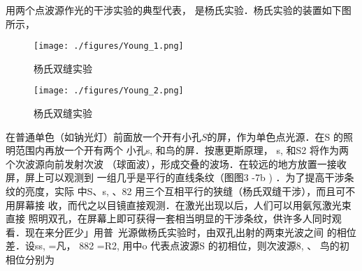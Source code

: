 
用两个点波源作光的干涉实验的典型代表， 是杨氏实验．杨氏实验的装置如下图所示，
\begin{figure}[ht]
\centering
\texttt{[image: ./figures/Young\_1.png]}
\caption{杨氏双缝实验} \label{Young_fig1}
\end{figure}
\begin{figure}[ht]
\centering
\texttt{[image: ./figures/Young\_2.png]}
\caption{杨氏双缝实验} \label{Young_fig2}
\end{figure}
在普通单色（如钠光灯）前面放一个开有小孔$S$的屏，作为单色点光源．在S 的照明范围内再放一个开有两个
小孔s, 和鸟的屏．按惠更斯原理， s, 和S2 将作为两个次波源向前发射次波
（球面波），形成交叠的波场．在较远的地方放置一接收屏，屏上可以观测到
一组几乎是平行的直线条纹（图图3 -7b ) ．为了提高干涉条纹的亮度，实际
中S、s, 、82 用三个互相平行的狭缝（杨氏双缝干涉），而且可不用屏幕接
收，而代之以目镜直接观测．在激光出现以后，人们可以用氨氖激光束直接
照明双孔，在屏幕上即可获得一套相当明显的干涉条纹，供许多人同时观
看．现在来分匠少」用普~光源做杨氏实验时，由双孔出射的两束光波之间
的相位差．设ss, =凡， 882 =R2, 用中o 代表点波源S 的初相位，则次波源8, 、
鸟的初相位分别为